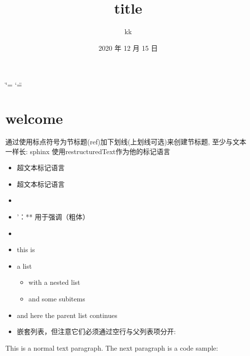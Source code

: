 \documentclass[a4paper,10pt,english,openany,oneside]{sphinxmanual}
\title{title \unexpanded{说明}}
\date{2020 年 12 月 15 日}
\author{kk}
\begin{document}
\ifdefined\shorthandoff
  \ifnum\catcode`\=\string=\active\shorthandoff{=}\fi
  \ifnum\catcode`\"=\active{}\fi
\fi

\pagestyle{empty}
\sphinxmaketitle
\pagestyle{plain}
\sphinxtableofcontents
\pagestyle{normal}
\label{\detokenize{index::doc}}



\chapter{welcome}
\label{\detokenize{welcome:welcome}}\label{\detokenize{welcome::doc}}
通过使用标点符号为节标题(ref)加下划线(上划线可选)来创建节标题, 至少与文本一样长:
sphinx 使用restructuredText作为他的标记语言
\begin{itemize}
\item {} 
 超文本标记语言

\item {} 
 超文本标记语言

\item {} 
 

\item {} 
’：** 用于强调（粗体）

\item {} 

\end{itemize}
\begin{itemize}
\item {} 
this is

\item {} 
a list
\begin{itemize}
\item {} 
with a nested list

\item {} 
and some subitems

\end{itemize}

\item {} 
and here the parent list continues

\item {} 
嵌套列表，但注意它们必须通过空行与父列表项分开:

\end{itemize}

This is a normal text paragraph. The next paragraph is a code sample:
\end{document}
